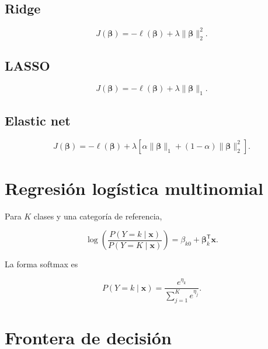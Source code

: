 \documentclass[
  spanish,
  10.5pt,
  letterpaper,
  DIV=11,
  numbers=noendperiod,
  oneside,
  open=any]{scrreprt}
\theoremstyle{definition}
\theoremstyle{definition}
\theoremstyle{plain}
\theoremstyle{remark}
\begin{document}

\subsection*{Ridge}\label{ridge}

\[
J(\boldsymbol{\beta})
=
-\ell(\boldsymbol{\beta})
+
\lambda
\|\boldsymbol{\beta}\|_2^2.
\]

\subsection*{LASSO}\label{lasso-1}

\[
J(\boldsymbol{\beta})
=
-\ell(\boldsymbol{\beta})
+
\lambda
\|\boldsymbol{\beta}\|_1.
\]

\subsection*{Elastic net}\label{elastic-net-1}

\[
J(\boldsymbol{\beta})
=
-\ell(\boldsymbol{\beta})
+
\lambda
\left[
\alpha
\|\boldsymbol{\beta}\|_1
+
(1-\alpha)
\|\boldsymbol{\beta}\|_2^2
\right].
\]

\section*{Regresión logística
multinomial}\label{regresiuxf3n-loguxedstica-multinomial}


Para \(K\) clases y una categoría de referencia,

\[
\log
\left(
\frac{
P(Y=k\mid\mathbf{x})
}{
P(Y=K\mid\mathbf{x})
}
\right)
=
\beta_{k0}
+
\boldsymbol{\beta}_k^{\mathsf T}\mathbf{x}.
\]

La forma softmax es

\[
P(Y=k\mid\mathbf{x})
=
\frac{
e^{\eta_k}
}{
\sum_{j=1}^{K}e^{\eta_j}
}.
\]

\section*{Frontera de decisión}\label{frontera-de-decisiuxf3n-1}

\end{document}
